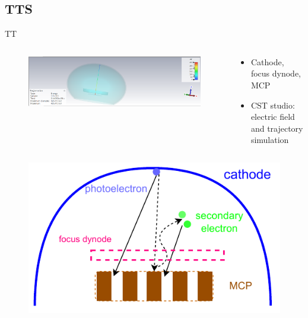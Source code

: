 \documentclass[aspectratio=169]{beamer}
\begin{document}
\subsection{TTS}
\begin{frame}{TT}
    \begin{columns}
        \begin{column}{0.7\textwidth}
            \begin{figure}
                \includegraphics[width=\columnwidth]{driftTime.png}
            \end{figure}
        \end{column}
        \begin{column}{0.3\textwidth}
            \begin{itemize}
                \item Cathode, focus dynode, MCP
                \item CST studio: electric field and trajectory simulation
            \end{itemize}
        \end{column}
    \end{columns}
    \begin{columns}
        \begin{column}{0.4\textwidth}
            \begin{figure}
                \includegraphics[width=\columnwidth]{../figures/method/MCPelectron.pdf}    

\end{figure}
\end{column}
\end{columns}
\end{frame}
\end{document}

